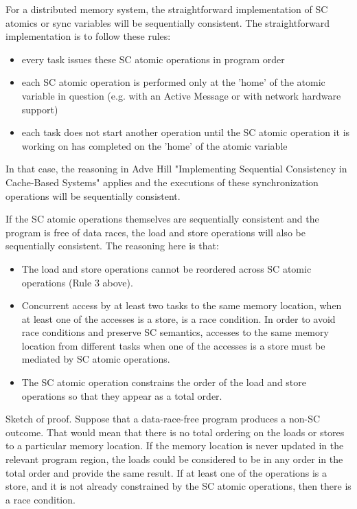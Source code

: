 For a distributed memory system, the straightforward implementation of SC
atomics or sync variables will be sequentially consistent. The straightforward
implementation is to follow these rules:

\begin{itemize}

 \item every task issues these SC atomic operations in program order

 \item each SC atomic operation is performed only at the 'home' of the atomic
 variable in question (e.g. with an Active Message or with network hardware
 support)

 \item each task does not start another operation until the SC atomic operation
 it is working on has completed on the 'home' of the atomic variable

\end{itemize}

In that case, the reasoning in Adve Hill "Implementing Sequential Consistency
in Cache-Based Systems" applies and the executions of these synchronization
operations will be sequentially consistent.

If the SC atomic operations themselves are sequentially consistent and the
program is free of data races, the load and store operations will also be
sequentially consistent. The reasoning here is that:

\begin{itemize}

 \item The load and store operations cannot be reordered across SC atomic
 operations (Rule 3 above).

 \item Concurrent access by at least two tasks to the same memory location,
 when at least one of the accesses is a store, is a race condition. In order to
 avoid race conditions and preserve SC semantics, accesses to the same memory
 location from different tasks when one of the accesses is a store must be
 mediated by SC atomic operations.

 \item The SC atomic operation constrains the order of the load and store
 operations so that they appear as a total order.
\end{itemize}

Sketch of proof. Suppose that a data-race-free program produces a non-SC
outcome. That would mean that there is no total ordering on the loads or stores
to a particular memory location. If the memory location is never updated in the
relevant program region, the loads could be considered to be in any order in
the total order and provide the same result. If at least one of the operations
is a store, and it is not already constrained by the SC atomic operations, then
there is a race condition.


